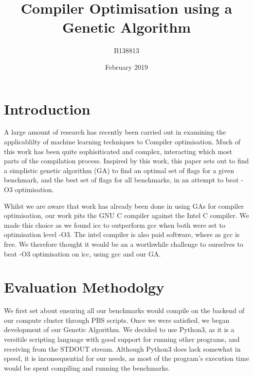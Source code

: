 \documentclass[conference]{IEEEtran}
\title{Compiler Optimisation using a Genetic Algorithm}
\author{B138813}
\date{February 2019}
\begin{document}



\maketitle
\IEEEdisplaynontitleabstractindextext

\section{Introduction}
A large amount of research has recently been carried out in examining the applicablilty of machine learning techniques to Compiler optimisation\cite{wang2018machine}\cite{fursin2008milepost}. Much of this work has been quite sophisiticated and complex, interacting which most parts of the compilation process. Inspired by this work, this paper sets out to find a simplistic genetic algorithm (GA) to find an optimal set of flags for a given benchmark, and the best set of flags for all benchmarks, in an attempt to beat -O3 optimisation.

Whilst we are aware that work has already been done in using GAs for compiler optimisation\cite{agakov2006using}, our work pits the GNU C compiler against the Intel C compiler. We made this choice as we found icc to outperform gcc when both were set to optimisation level -O3. The intel compiler is also paid software, where as gcc is free.  We therefore thought it would be an a worthwhile challenge to ourselves to beat -O3 optimisation on icc, using gcc and our GA.

\section{Evaluation Methodolgy}
We first set about ensuring all our benchmarks would compile on the backend of our compute cluster through PBS scripts. Once we were satisfied, we began development of our Genetic Algorithm. We decided to use Python3, as it is a versitile scripting language with good support for running other programs, and receiving from the STDOUT stream. Although Python3 does lack somewhat in speed, it is inconsequential for our needs, as most of the program's execution time would be spent compiling and running the benchmarks.
\end{document}
